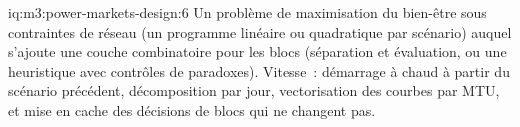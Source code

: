 \begin{solution}{iq:m3:power-markets-design:6}
Un problème de maximisation du bien-être sous contraintes de réseau (un programme linéaire ou quadratique
par scénario) auquel s'ajoute une couche combinatoire pour les blocs (séparation et évaluation, ou une heuristique avec
contrôles de paradoxes). Vitesse~: démarrage à chaud à partir du scénario précédent, décomposition par jour, vectorisation
des courbes par MTU, et mise en cache des décisions de blocs qui ne changent pas.
\end{solution}
